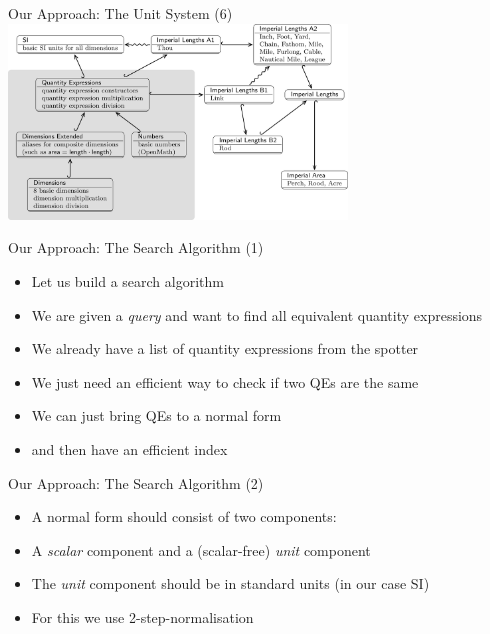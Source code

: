 \documentclass{beamer}
\begin{document}
  \begin{frame}{Our Approach: The Unit System (6)}
    \includegraphics[width=90mm]{imgs/graph1.png}
  \end{frame}

  \begin{frame}{Our Approach: The Search Algorithm (1)}
    \begin{itemize}[<+->]
      \item Let us build a search algorithm
      \item We are given a \textit{query} and want to find all equivalent quantity expressions
      \item We already have a list of quantity expressions from the spotter
      \item We just need an efficient way to check if two QEs are the same
      \item We can just bring QEs to a normal form
      \item and then have an efficient index
    \end{itemize}
  \end{frame}

  \begin{frame}{Our Approach: The Search Algorithm (2)}
    \begin{itemize}[<+->]
      \item A normal form should consist of two components:
      \item A \textit{scalar} component and a (scalar-free) \textit{unit} component
      \item The \textit{unit} component should be in standard units (in our case SI)
      \item For this we use 2-step-normalisation
    \end{itemize}
  \end{frame}
\end{document}
